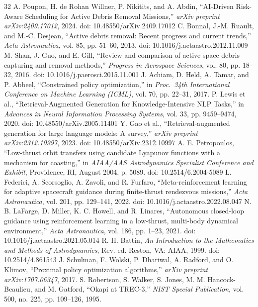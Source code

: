 \documentclass[10pt,conference,a4paper]{IEEEtran}
\begin{document}
\begin{thebibliography}{32}
 A. Poupon, H. de Rohan Willner, P. Nikitits, and A. Abdin, ``AI-Driven Risk-Aware Scheduling for Active Debris Removal Missions,'' \textit{arXiv preprint arXiv:2409.17012}, 2024. doi: 10.48550/arXiv.2409.17012
 C. Bonnal, J.-M. Ruault, and M.-C. Desjean, ``Active debris removal: Recent progress and current trends,'' \textit{Acta Astronautica}, vol. 85, pp. 51--60, 2013. doi: 10.1016/j.actaastro.2012.11.009
 M. Shan, J. Guo, and E. Gill, ``Review and comparison of active space debris capturing and removal methods,'' \textit{Progress in Aerospace Sciences}, vol. 80, pp. 18--32, 2016. doi: 10.1016/j.paerosci.2015.11.001
 J. Achiam, D. Held, A. Tamar, and P. Abbeel, ``Constrained policy optimization,'' in \textit{Proc.\ 34th International Conference on Machine Learning (ICML)}, vol. 70, pp. 22--31, 2017.
 P. Lewis et al., ``Retrieval-Augmented Generation for Knowledge-Intensive NLP Tasks,'' in \textit{Advances in Neural Information Processing Systems}, vol. 33, pp. 9459--9474, 2020. doi: 10.48550/arXiv.2005.11401
 Y. Gao et al., ``Retrieval-augmented generation for large language models: A survey,'' \textit{arXiv preprint arXiv:2312.10997}, 2023. doi: 10.48550/arXiv.2312.10997
 A. E. Petropoulos, ``Low-thrust orbit transfers using candidate Lyapunov functions with a mechanism for coasting,'' in \textit{AIAA/AAS Astrodynamics Specialist Conference and Exhibit}, Providence, RI, August 2004, p. 5089. doi: 10.2514/6.2004-5089
 L. Federici, A. Scorsoglio, A. Zavoli, and R. Furfaro, ``Meta-reinforcement learning for adaptive spacecraft guidance during finite-thrust rendezvous missions,'' \textit{Acta Astronautica}, vol. 201, pp. 129--141, 2022. doi: 10.1016/j.actaastro.2022.08.047
 N. B. LaFarge, D. Miller, K. C. Howell, and R. Linares, ``Autonomous closed-loop guidance using reinforcement learning in a low-thrust, multi-body dynamical environment,'' \textit{Acta Astronautica}, vol. 186, pp. 1--23, 2021. doi: 10.1016/j.actaastro.2021.05.014
 R. H. Battin, \textit{An Introduction to the Mathematics and Methods of Astrodynamics}, Rev. ed. Reston, VA: AIAA, 1999. doi: 10.2514/4.861543
 J. Schulman, F. Wolski, P. Dhariwal, A. Radford, and O. Klimov, ``Proximal policy optimization algorithms,'' \textit{arXiv preprint arXiv:1707.06347}, 2017.
 S. Robertson, S. Walker, S. Jones, M. M. Hancock-Beaulieu, and M. Gatford, ``Okapi at TREC-3,'' \textit{NIST Special Publication}, vol. 500, no. 225, pp. 109--126, 1995.

\end{thebibliography}
\end{document}
